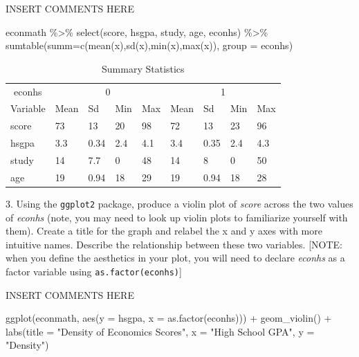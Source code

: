 \documentclass[
  letterpaper,
  DIV=11,
  numbers=noendperiod]{scrartcl}
\newenvironment{Shaded}{\begin{snugshade}}{\end{snugshade}}
\newcommand{\AttributeTok}[1]{\textcolor[rgb]{0.40,0.45,0.13}{#1}}
\newcommand{\FunctionTok}[1]{\textcolor[rgb]{0.28,0.35,0.67}{#1}}
\newcommand{\NormalTok}[1]{\textcolor[rgb]{0.00,0.23,0.31}{#1}}
\newcommand{\SpecialCharTok}[1]{\textcolor[rgb]{0.37,0.37,0.37}{#1}}
\newcommand{\StringTok}[1]{\textcolor[rgb]{0.13,0.47,0.30}{#1}}
\begin{document}
INSERT COMMENTS HERE

\begin{Shaded}
\begin{Highlighting}[]
\NormalTok{econmath }\SpecialCharTok{\%\textgreater{}\%} 
  \FunctionTok{select}\NormalTok{(score, hsgpa, study, age, econhs) }\SpecialCharTok{\%\textgreater{}\%} 
  \FunctionTok{sumtable}\NormalTok{(}\AttributeTok{summ=}\FunctionTok{c}\NormalTok{(}\StringTok{\textquotesingle{}mean(x)\textquotesingle{}}\NormalTok{,}\StringTok{\textquotesingle{}sd(x)\textquotesingle{}}\NormalTok{,}\StringTok{\textquotesingle{}min(x)\textquotesingle{}}\NormalTok{,}\StringTok{\textquotesingle{}max(x)\textquotesingle{}}\NormalTok{),}
           \AttributeTok{group =} \StringTok{\textquotesingle{}econhs\textquotesingle{}}\NormalTok{)}
\end{Highlighting}
\end{Shaded}

\begin{table}

\caption{Summary Statistics}
\centering
\begin{tabular}[t]{lllllllll}
\toprule
\multicolumn{1}{c}{econhs} & \multicolumn{4}{c}{0} & \multicolumn{4}{c}{1} \\
\cmidrule(l{3pt}r{3pt}){1-1} \cmidrule(l{3pt}r{3pt}){2-5} \cmidrule(l{3pt}r{3pt}){6-9}
Variable & Mean & Sd & Min & Max & Mean & Sd & Min & Max\\
\midrule
score & 73 & 13 & 20 & 98 & 72 & 13 & 23 & 96\\
hsgpa & 3.3 & 0.34 & 2.4 & 4.1 & 3.4 & 0.35 & 2.4 & 4.3\\
study & 14 & 7.7 & 0 & 48 & 14 & 8 & 0 & 50\\
age & 19 & 0.94 & 18 & 29 & 19 & 0.94 & 18 & 28\\
\bottomrule
\end{tabular}
\end{table}

3. Using the \texttt{ggplot2} package, produce a violin plot of
\emph{score} across the two values of \emph{econhs} (note, you may need
to look up violin plots to familiarize yourself with them). Create a
title for the graph and relabel the x and y axes with more intuitive
names. Describe the relationship between these two variables. {[}NOTE:
when you define the aesthetics in your plot, you will need to declare
\emph{econhs} as a factor variable using \texttt{as.factor(econhs)}{]}

INSERT COMMENTS HERE

\begin{Shaded}
\begin{Highlighting}[]
\FunctionTok{ggplot}\NormalTok{(econmath, }\FunctionTok{aes}\NormalTok{(}\AttributeTok{y =}\NormalTok{ hsgpa, }\AttributeTok{x =} \FunctionTok{as.factor}\NormalTok{(econhs))) }\SpecialCharTok{+}
  \FunctionTok{geom\_violin}\NormalTok{() }\SpecialCharTok{+}
  \FunctionTok{labs}\NormalTok{(}\AttributeTok{title =} \StringTok{"Density of Economics Scores"}\NormalTok{, }
       \AttributeTok{x =} \StringTok{"High School GPA"}\NormalTok{, }\AttributeTok{y =} \StringTok{"Density"}\NormalTok{)}
\end{Highlighting}
\end{Shaded}
\end{document}
